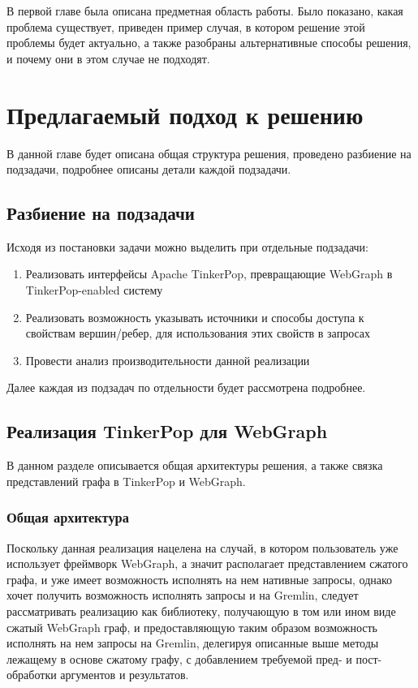 \documentclass[times,specification,annotation]{itmo-student-thesis}
\begin{document}
\finishrelatedwork

\chapterconclusion
В первой главе была описана предметная область работы. Было показано, какая проблема существует, приведен пример случая, в котором решение этой проблемы будет актуально, а также разобраны альтернативные способы решения, и почему они в этом случае не подходят.

\chapter{Предлагаемый подход к решению}

В данной главе будет описана общая структура решения, проведено разбиение на подзадачи, подробнее описаны детали каждой подзадачи. 

\section{Разбиение на подзадачи}

Исходя из постановки задачи можно выделить при отдельные подзадачи:

\begin{enumerate}
    \item Реализовать интерфейсы Apache TinkerPop, превращающие WebGraph в TinkerPop-enabled систему
    \item Реализовать возможность указывать источники и способы доступа к свойствам вершин/ребер, для использования этих свойств в запросах
    \item Провести анализ производительности данной реализации
\end{enumerate}

Далее каждая из подзадач по отдельности будет рассмотрена подробнее.

\section{Реализация TinkerPop для WebGraph}

В данном разделе описывается общая архитектуры решения, а также  связка представлений графа в TinkerPop и WebGraph.

\subsection{Общая архитектура}

Поскольку данная реализация нацелена на случай, в котором пользователь уже использует фреймворк WebGraph, а значит располагает представлением сжатого графа, и уже имеет возможность исполнять на нем нативные запросы, однако хочет получить возможность исполнять запросы и на Gremlin, следует рассматривать реализацию как библиотеку, получающую в том или ином виде сжатый WebGraph граф, и предоставляющую таким образом возможность исполнять на нем запросы на Gremlin, делегируя описанные выше методы лежащему в основе сжатому графу, с добавлением требуемой пред- и пост-обработки аргументов и результатов.
\end{document}
